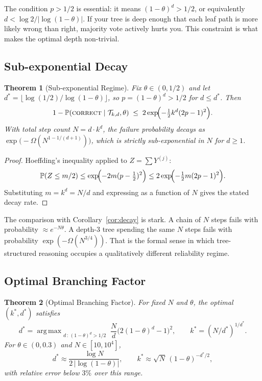 \documentclass[11pt]{article}
\theoremstyle{plain}
\newtheorem{theorem}{Theorem}[section]
\theoremstyle{definition}
\newcommand{\Prob}{\mathbb{P}}
\newcommand{\tree}{\mathcal{T}}
\newcommand{\correct}{\textsc{correct}}
\DeclareMathOperator*{\argmax}{arg\,max}
\begin{document}
The condition $p > 1/2$ is essential: it means $(1-\theta)^d > 1/2$, or
equivalently $d < \log 2/|\log(1-\theta)|$. If your tree is deep enough
that each leaf path is more likely wrong than right, majority vote actively
hurts you. This constraint is what makes the optimal depth non-trivial.

\subsection{Sub-exponential Decay}

\begin{theorem}[Sub-exponential Regime]\label{thm:subexp}
  Fix $\theta \in (0,1/2)$ and let $d^* = \lfloor \log(1/2)/\log(1-\theta)\rfloor$,
  so $p = (1-\theta)^d > 1/2$ for $d \leq d^*$. Then
  \[
    1 - \Prob(\correct \mid \tree_{k,d}, \theta)
    \;\leq\; 2\exp\!\Bigl(-\tfrac{1}{2}k^d(2p-1)^2\Bigr).
  \]
  With total step count $N = d\cdot k^d$, the failure probability decays as
  $\exp\bigl(-\Omega(N^{1 - 1/(d+1)})\bigr)$, which is strictly sub-exponential
  in $N$ for $d \geq 1$.
\end{theorem}

\begin{proof}
  Hoeffding's inequality applied to $Z = \sum Y^{(j)}$:
  \[
    \Prob(Z \leq m/2)
    \leq \exp\!\Bigl(-2m(p-\tfrac{1}{2})^2\Bigr)
    \leq 2\exp\!\Bigl(-\tfrac{1}{2}m(2p-1)^2\Bigr).
  \]
  Substituting $m = k^d = N/d$ and expressing as a function of $N$ gives
  the stated decay rate.
\end{proof}

The comparison with Corollary~\ref{cor:decay} is stark. A chain of $N$ steps
fails with probability $\approx e^{-N\theta}$. A depth-3 tree spending the
same $N$ steps fails with probability $\exp(-\Omega(N^{3/4}))$. That is the
formal sense in which tree-structured reasoning occupies a qualitatively
different reliability regime.

\subsection{Optimal Branching Factor}

\begin{theorem}[Optimal Branching Factor]\label{thm:optk}
  For fixed $N$ and $\theta$, the optimal $(k^*, d^*)$ satisfies
  \[
    d^* = \argmax_{\substack{d\,:\,(1-\theta)^d > 1/2}}
    \frac{N}{d}\bigl(2(1-\theta)^d - 1\bigr)^2, \qquad k^* = (N/d^*)^{1/d^*}.
  \]
  For $\theta \in (0,0.3)$ and $N \in [10, 10^4]$,
  \[
    d^* \approx \frac{\log N}{2\,|\log(1-\theta)|}, \qquad
    k^* \approx \sqrt{N}\,(1-\theta)^{-d^*/2},
  \]
  with relative error below $3\%$ over this range.
\end{theorem}
\end{document}
